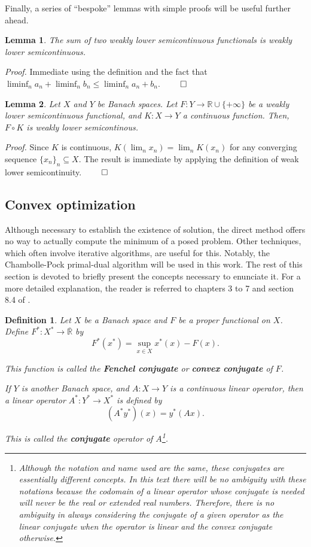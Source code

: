 \documentclass[twocolumn,twoside,a4paper,10pt]{IEEEtran}
\newtheorem{definition}{Definition}
\newtheorem{lemma}{Lemma}
\begin{document}
Finally, a series of ``bespoke'' lemmas with simple proofs will be useful further ahead.

\begin{lemma}\label{lemma:sum-of-lsc}
  The sum of two weakly lower semicontinuous functionals is weakly lower semicontinuous.
\end{lemma}

\textit{Proof.} Immediate using the definition and the fact that \(\liminf_n{a_n} + \liminf_n{b_n}\leq \liminf_n{a_n + b_n}\). \(\qed\)

\begin{lemma}\label{lemma:precomposition-with-linear}
  Let \(X\) and \(Y\) be Banach spaces. Let \(F\colon Y\to \mathbb{R}\cup\{+\infty\}\) be a weakly lower semicontinuous functional, and \(K\colon X\to Y\) a continuous function. Then, \(F\circ K\) is weakly lower semicontinous.
\end{lemma}

\textit{Proof.} Since \(K\) is continuous, \(K(\lim_n x_n) = \lim_n K(x_n)\) for any converging sequence \(\{x_n\}_n\subseteq X\). The result is immediate by applying the definition of weak lower semicontinuity. \(\qed\)

\subsection{Convex optimization} Although necessary to establish the existence of solution, the direct method offers no way to actually compute the minimum of a posed problem. Other techniques, which often involve iterative algorithms, are useful for this. Notably, the Chambolle-Pock primal-dual algorithm will be used in this work. The rest of this section is devoted to briefly present the concepts necessary to enunciate it. For a more detailed explanation, the reader is referred to chapters 3 to 7 and section 8.4 of \cite{clason2024introductionnonsmoothanalysisoptimization}.

\begin{definition}
  Let \(X\) be a Banach space and \(F\) be a proper functional on \(X\). Define \(F^*\colon X^*\to\overline{\mathbb{R}}\) by
  \[
    F^*(x^*) = \sup_{x\in X}x^*(x) - F(x)
  .\]

  This function is called the \textbf{Fenchel conjugate} or \textbf{convex conjugate} of \(F\).

  If \(Y\) is another Banach space, and \(A\colon X\to Y\) is a continuous linear operator, then a linear operator \(A^*\colon Y^*\to X^*\) is defined by
  \[
     (A^*y^*)(x) = y^*(Ax)
  .\]

  This is called the \textbf{conjugate} operator of \(A\)\footnote{Although the notation and name used are the same, these conjugates are essentially different concepts. In this text there will be no ambiguity with these notations because the codomain of a linear operator whose conjugate is needed will never be the real or extended real numbers. Therefore, there is no ambiguity in always considering the conjugate of a given operator as the linear conjugate when the operator is linear and the convex conjugate otherwise.}.
\end{definition}
\end{document}

